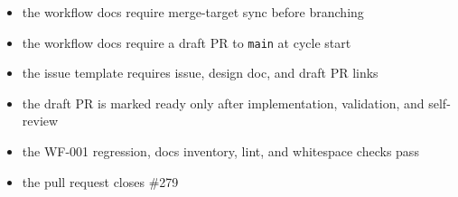 \begin{itemize}
\tightlist
\item
  the workflow docs require merge-target sync before branching
\item
  the workflow docs require a draft PR to \texttt{m\allowbreak{}a\allowbreak{}i\allowbreak{}n} at cycle start
\item
  the issue template requires issue, design doc, and draft PR links
\item
  the draft PR is marked ready only after implementation, validation, and self-review
\item
  the WF-001 regression, docs inventory, lint, and whitespace checks pass
\item
  the pull request closes \#279
\end{itemize}

